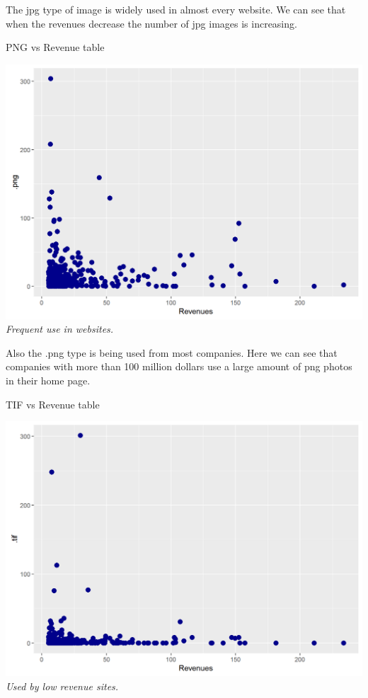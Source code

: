 \documentclass{article}
\begin{document}
The jpg type of image is widely used in almost every website. We can see that when the revenues decrease the number of jpg images is increasing. 
\begin{table}[H]
\centering
\caption{PNG vs Revenue table}
\begin{center}
\includegraphics[scale=0.5]{../R/photos/60_png_rev.png}    \\
\textit{Frequent use in websites.}
\end{center}
\end{table}
Also the .png type is being used from most companies. Here we can see that companies with more than 100 million dollars use a large amount of png photos in their home page.
\begin{table}[H]
\centering
\caption{TIF vs Revenue table}
\begin{center}
\includegraphics[scale=0.5]{../R/photos/61_tif_rev.png}    \\
\textit{Used by low revenue sites.}
\end{center}
\end{table}
\end{document}

